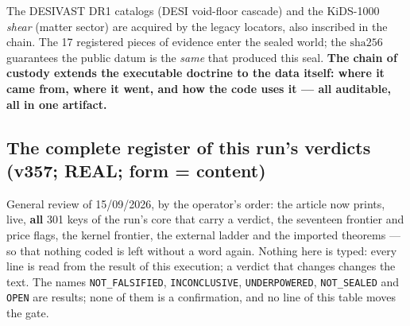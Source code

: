 \documentclass[11pt]{article}
\theoremstyle{definition}\newtheorem{deriv}{Derivation}
\begin{document}
The DESIVAST DR1 catalogs (DESI void-floor cascade) and the KiDS-1000 \emph{shear} (matter sector) are acquired by the legacy locators, also inscribed in the chain. The 17 registered pieces of evidence enter the sealed world; the $\mathrm{sha}256$ guarantees the public datum is the \emph{same} that produced this seal. \textbf{The chain of custody extends the executable doctrine to the data itself: where it came from, where it went, and how the code uses it --- all auditable, all in one artifact.}

\subsection*{The complete register of this run's verdicts (v357; REAL; form = content)}

General review of 15/09/2026, by the operator's order: the article now prints, live, \textbf{all} 301 keys of the run's core that carry a verdict, the seventeen frontier and price flags, the kernel frontier, the external ladder and the imported theorems --- so that nothing coded is left without a word again. Nothing here is typed: every line is read from the result of this execution; a verdict that changes changes the text. The names \texttt{NOT\_FALSIFIED}, \texttt{INCONCLUSIVE}, \texttt{UNDERPOWERED}, \texttt{NOT\_SEALED} and \texttt{OPEN} are results; none of them is a confirmation, and no line of this table moves the gate.
\end{document}
